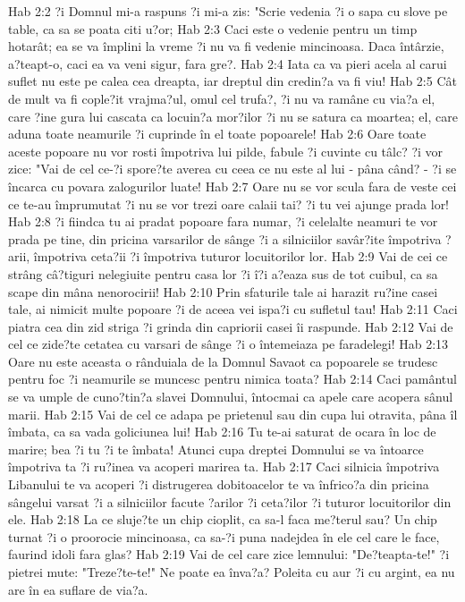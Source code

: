 Hab 2:2  ?i Domnul mi-a raspuns ?i mi-a zis: "Scrie vedenia ?i o sapa cu slove pe table, ca sa se poata citi u?or;
Hab 2:3  Caci este o vedenie pentru un timp hotarât; ea se va împlini la vreme ?i nu va fi vedenie mincinoasa. Daca întârzie, a?teapt-o, caci ea va veni sigur, fara gre?.
Hab 2:4  Iata ca va pieri acela al carui suflet nu este pe calea cea dreapta, iar dreptul din credin?a va fi viu!
Hab 2:5  Cât de mult va fi cople?it vrajma?ul, omul cel trufa?, ?i nu va ramâne cu via?a el, care ?ine gura lui cascata ca locuin?a mor?ilor ?i nu se satura ca moartea; el, care aduna toate neamurile ?i cuprinde în el toate popoarele!
Hab 2:6  Oare toate aceste popoare nu vor rosti împotriva lui pilde, fabule ?i cuvinte cu tâlc? ?i vor zice: "Vai de cel ce-?i spore?te averea cu ceea ce nu este al lui - pâna când? - ?i se încarca cu povara zalogurilor luate!
Hab 2:7  Oare nu se vor scula fara de veste cei ce te-au împrumutat ?i nu se vor trezi oare calaii tai? ?i tu vei ajunge prada lor!
Hab 2:8  ?i fiindca tu ai pradat popoare fara numar, ?i celelalte neamuri te vor prada pe tine, din pricina varsarilor de sânge ?i a silniciilor savâr?ite împotriva ?arii, împotriva ceta?ii ?i împotriva tuturor locuitorilor lor.
Hab 2:9  Vai de cei ce strâng câ?tiguri nelegiuite pentru casa lor ?i î?i a?eaza sus de tot cuibul, ca sa scape din mâna nenorocirii!
Hab 2:10  Prin sfaturile tale ai harazit ru?ine casei tale, ai nimicit multe popoare ?i de aceea vei ispa?i cu sufletul tau!
Hab 2:11  Caci piatra cea din zid striga ?i grinda din capriorii casei îi raspunde.
Hab 2:12  Vai de cel ce zide?te cetatea cu varsari de sânge ?i o întemeiaza pe faradelegi!
Hab 2:13  Oare nu este aceasta o rânduiala de la Domnul Savaot ca popoarele se trudesc pentru foc ?i neamurile se muncesc pentru nimica toata?
Hab 2:14  Caci pamântul se va umple de cuno?tin?a slavei Domnului, întocmai ca apele care acopera sânul marii.
Hab 2:15  Vai de cel ce adapa pe prietenul sau din cupa lui otravita, pâna îl îmbata, ca sa vada goliciunea lui!
Hab 2:16  Tu te-ai saturat de ocara în loc de marire; bea ?i tu ?i te îmbata! Atunci cupa dreptei Domnului se va întoarce împotriva ta ?i ru?inea va acoperi marirea ta.
Hab 2:17  Caci silnicia împotriva Libanului te va acoperi ?i distrugerea dobitoacelor te va înfrico?a din pricina sângelui varsat ?i a silniciilor facute ?arilor ?i ceta?ilor ?i tuturor locuitorilor din ele.
Hab 2:18  La ce sluje?te un chip cioplit, ca sa-l faca me?terul sau? Un chip turnat ?i o proorocie mincinoasa, ca sa-?i puna nadejdea în ele cel care le face, faurind idoli fara glas?
Hab 2:19  Vai de cel care zice lemnului: "De?teapta-te!" ?i pietrei mute: "Treze?te-te!" Ne poate ea înva?a? Poleita cu aur ?i cu argint, ea nu are în ea suflare de via?a.

